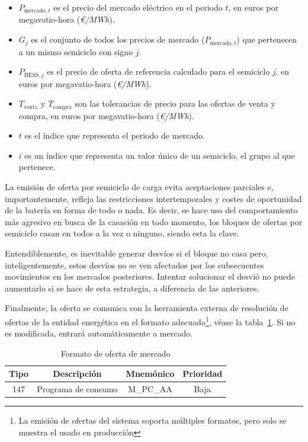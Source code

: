 \begin{itemize}
\item \( P_{\text{mercado}, t} \) es el precio del mercado eléctrico en el periodo \( t \), en euros por megavatio-hora (\textit{€/MWh}).

\item \( G_{j} \) es el conjunto de todos los precios de mercado (\( P_{\text{mercado}, t} \)) que pertenecen a un mismo semiciclo con signo \( j \).

\item \( P_{\text{BESS}, j} \) es el precio de oferta de referencia calculado para el semiciclo \( j \), en euros por megavatio-hora (\textit{€/MWh}).

\item \( T_{\text{venta}} \) y \( T_{\text{compra}} \) son las tolerancias de precio para las ofertas de venta y compra, en euros por megavatio-hora (\textit{€/MWh}).

\item \( t \) es el índice que representa el periodo de mercado.

\item \( i \) es un índice que representa un valor único de un semiciclo, el grupo al que pertenece.

\end{itemize}

La emisión de oferta por semiciclo de carga evita aceptaciones parciales e, importantemente, refleja las restricciones intertemporales y costes de oportunidad de la batería en forma de todo o nada. Es decir, se hace uso del comportamiento más agresivo en busca de la casación en todo momento, los bloques de ofertas por semiciclo casan en todos a la vez o ninguno, siendo esta la clave.

Entendiblemente, es inevitable generar desvíos si el bloque no casa pero, inteligentemente, estos desvíos no se ven afectados por los subsecuentes movimientos en los mercados posteriores. Intentar solucionar el desvió no puede aumentarlo si se hace de esta estrategia, a diferencia de las anteriores.

Finalmente, la oferta se comunica con la herramienta externa de resolución de ofertas de la entidad energética en el formato adecuado\footnote{La emisión de ofertas del sistema soporta múltiples formatos, pero solo se muestra el usado en producción}, véase la tabla~\ref{tab:formato-oferta}. Si no es modificada, entrará automáticamente a mercado.

\begin{table}[ht]
\centering
\begin{tabular}{|c|c|c|c|}
\hline
Tipo & Descripción         & Mnemónico & Prioridad \\
\hline
147  & Programa de consumo & M\_PC\_AA & Baja      \\
\hline
\end{tabular}
\caption{Formato de oferta de mercado}
\label{tab:formato-oferta}
\end{table}

